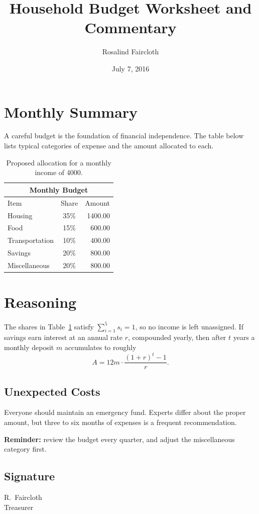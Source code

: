 \documentclass[10pt,letterpaper]{article}
\title{Household Budget Worksheet and Commentary}
\author{Rosalind Faircloth}
\date{July 7, 2016}
\begin{document}
\maketitle

\section{Monthly Summary}
A careful budget is the foundation of financial independence. The table
below lists typical categories of expense and the amount allocated to each.

\begin{table}[htbp]
\centering
\begin{tabular}{|l|c|r|}
\hline
\multicolumn{3}{|c|}{\textbf{Monthly Budget}} \\
\hline
Item & Share & Amount \\
\hline
Housing & 35\% & 1400.00 \\
Food & 15\% & 600.00 \\
Transportation & 10\% & 400.00 \\
Savings & 20\% & 800.00 \\
Miscellaneous & 20\% & 800.00 \\
\hline
\end{tabular}
\caption{Proposed allocation for a monthly income of 4000.}\label{tab:budget}
\end{table}

\bigskip
\section{Reasoning}
The shares in Table~\ref{tab:budget} satisfy
$\sum_{i=1}^{5} s_i = 1$, so no income is left unassigned. If savings
earn interest at an annual rate $r$, compounded yearly, then after $t$ years
a monthly deposit $m$ accumulates to roughly
\[
A = 12m \cdot \frac{(1+r)^t - 1}{r}.
\]

\subsection{Unexpected Costs}
Everyone should maintain an emergency fund. Experts differ about the proper
amount, but three to six months of expenses is a frequent recommendation.

\begin{flushleft}
\textbf{Reminder:} review the budget every quarter, and adjust the
miscellaneous category first.
\end{flushleft}

\vspace{2cm}
\subsection*{Signature}
\begin{flushright}
R.~Faircloth\\
Treasurer
\end{flushright}
\end{document}
